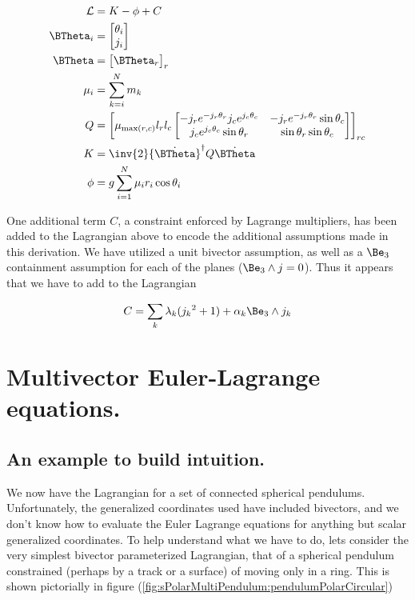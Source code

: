 \begin{align}\label{eqn:sPolarMultiPendulum:zoo20}
\LL &= K - \phi + C \\
\BTheta_i &=
\begin{bmatrix}
\theta_i \\
j_i
\end{bmatrix} \\
\BTheta &=
{\begin{bmatrix}
\BTheta_r
\end{bmatrix}}_{r} \\
\mu_i &=
\sum_{k=i}^N m_k \\
Q &=
{\begin{bmatrix}
\mu_{\max(r,c)}
l_r l_c
\begin{bmatrix}
- j_r e^{-j_r \theta_r} j_c e^{j_c\theta_c} & - j_r e^{-j_r \theta_r} \sin\theta_c \\
j_c e^{j_c \theta_c} \sin\theta_r & \sin\theta_r \sin\theta_c
\end{bmatrix}
\end{bmatrix}}_{rc} \\
K &=
\inv{2} {\dot{\BTheta}}^\dagger Q \dot{\BTheta} \\
\phi &=
g \sum_{i=1}^N \mu_i r_i \cos\theta_i
\end{align}

One additional term $C$, a constraint enforced by Lagrange multipliers, has been added to the Lagrangian above to encode the additional assumptions made in this derivation.  We have utilized a unit bivector assumption, as well as a $\Be_3$ containment assumption for each of the planes ($\Be_3 \wedge j = 0$).  Thus it appears that we have to add to the Lagrangian

\begin{align}\label{eqn:sPolarMultiPendulum:noo6}
C = \sum_k \lambda_k ( {j_k}^2 + 1 ) + \alpha_k \Be_3 \wedge j_k
\end{align}

\section{Multivector Euler-Lagrange equations.}

\subsection{An example to build intuition.}

We now have the Lagrangian for a set of connected spherical pendulums.  Unfortunately, the generalized coordinates used have included bivectors, and we don't know how to evaluate the Euler Lagrange equations for anything but scalar generalized coordinates.  To help understand what we have to do, lets consider the very simplest bivector parameterized Lagrangian, that of a spherical pendulum constrained (perhaps by a track or a surface) of moving only in a ring.  This is shown pictorially in figure (\ref{fig:sPolarMultiPendulum:pendulumPolarCircular})


